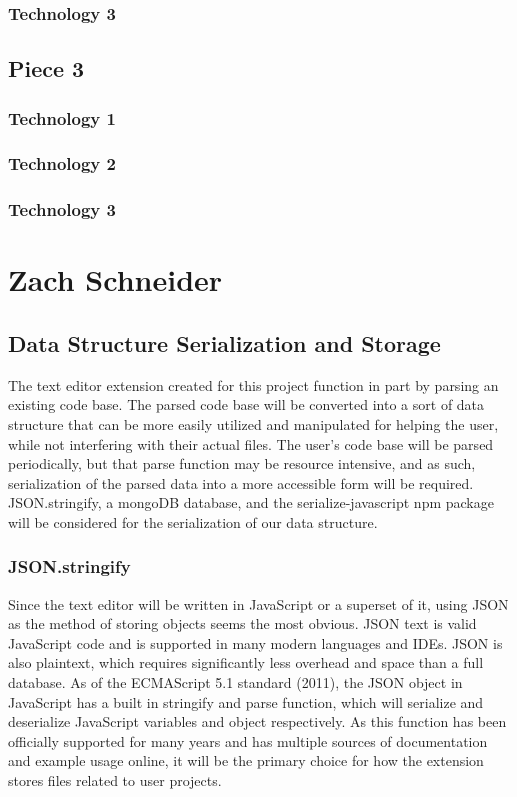 \documentclass[letterpaper,10pt,titlepage,draftclsnofoot,onecolumn,onesided] {IEEEtran}
\begin{document}
\subsubsection{Technology 3}

\subsection{Piece 3}
\subsubsection{Technology 1}
\subsubsection{Technology 2}
\subsubsection{Technology 3}


\section{Zach Schneider}
\subsection{Data Structure Serialization and Storage}
The text editor extension created for this project function in part by parsing an existing code base. 
The parsed code base will be converted into a sort of data structure that can be more easily utilized and manipulated for helping the user, while not interfering with their actual files. 
The user's code base will be parsed periodically, but that parse function may be resource intensive, and as such, serialization of the parsed data into a more accessible form will be required. 
JSON.stringify, a mongoDB database, and the serialize-javascript npm package will be considered for the serialization of our data structure.

\subsubsection{JSON.stringify}
Since the text editor will be written in JavaScript or a superset of it, using JSON as the method of storing objects seems the most obvious. 
JSON text is valid JavaScript code and is supported in many modern languages and IDEs. 
JSON is also plaintext, which requires significantly less overhead and space than a full database. 
As of the ECMAScript 5.1 standard (2011), the JSON object in JavaScript has a built in stringify and parse function, which will serialize and deserialize JavaScript variables and object respectively. 
As this function has been officially supported for many years and has multiple sources of documentation and example usage online, it will be the primary choice for how the extension stores files related to user projects. \cite{stringify}
\end{document}
